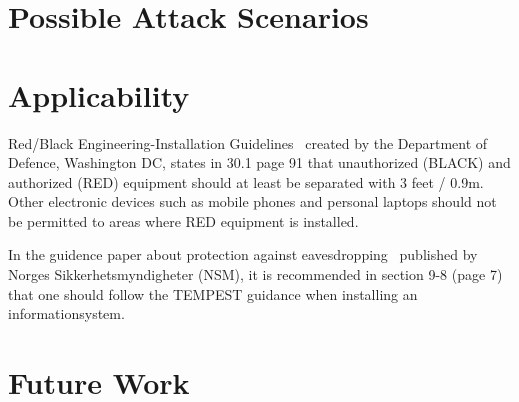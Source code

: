 \section{Possible Attack Scenarios}\label{chp6:sec:attack_scenarios}


\section{Applicability}\label{chp6:sec:applicability}

Red/Black Engineering-Installation Guidelines~\cite{MIL_HDBK_232} created by the Department of Defence, Washington DC, states in 30.1 page 91 that unauthorized (BLACK) and authorized (RED) equipment should at least be separated with 3 feet / 0.9m. 
Other electronic devices such as mobile phones and personal laptops should not be permitted to areas where RED equipment is installed. 


In the guidence paper about protection against eavesdropping~\cite{NSM_avlytting} published by Norges Sikkerhetsmyndigheter (NSM), it is recommended in section 9-8 (page 7) that one should follow the TEMPEST guidance when installing an informationsystem.

\section{Future Work}\label{chp6:sec:future_work}